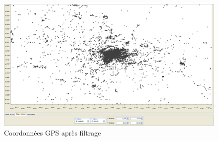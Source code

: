         \begin{figure}[h]
            \centering
            \includegraphics[scale=0.22]{../screenshots/geographic_after.png}
            \caption{Coordonnées GPS apr\`es filtrage}
            \label{diagram:geographic_after}
        \end{figure}
